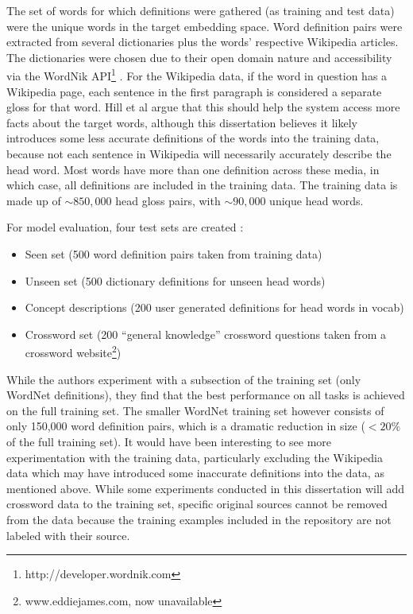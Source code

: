 \documentclass[11pt]{article}
\begin{document}
\begin{spacing}{1}
The set of words for which definitions were gathered (as training and test data) were the unique words in the target embedding space. Word definition pairs were extracted from several dictionaries plus the words' respective Wikipedia articles. The dictionaries were chosen due to their open domain nature and accessibility via the WordNik API\footnote{http://developer.wordnik.com} \cite{hill2015learning}. For the Wikipedia data, if the word in question has a Wikipedia page, each sentence in the first paragraph is considered a separate gloss for that word. Hill et al \citeyear{hill2015learning} argue that this should help the system access more facts about the target words, although this dissertation believes it likely introduces some less accurate definitions of the words into the training data, because not each sentence in Wikipedia will necessarily accurately describe the head word. Most words have more than one definition across these media, in which case, all definitions are included in the training data. The training data is made up of $\sim850,000$ head gloss pairs, with $\sim90,000$ unique head words.

For model evaluation, four test sets are created \cite{hill2015learning}: 
\begin{itemize}
\item Seen set (500 word definition pairs taken from training data)
\item Unseen set (500 dictionary definitions for unseen head words)
\item Concept descriptions (200 user generated definitions for head words in vocab)
\item Crossword set (200 ``general knowledge'' crossword questions taken from a crossword website\footnote{www.eddiejames.com, now unavailable})
\end{itemize}

While the authors experiment with a subsection of the training set (only WordNet definitions), they find that the best performance on all tasks is achieved on the full training set. The smaller WordNet training set however consists of only 150,000 word definition pairs, which is a dramatic reduction in size ($<20\%$ of the full training set). It would have been interesting to see more experimentation with the training data, particularly excluding the Wikipedia data which may have introduced some inaccurate definitions into the data, as mentioned above. While some experiments conducted in this dissertation will add crossword data to the training set, specific original sources cannot be removed from the data because the training examples included in the repository are not labeled with their source. 



\end{spacing}
\end{document}
